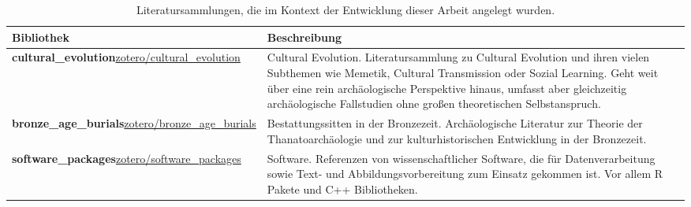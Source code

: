 \documentclass[openany,twoside,twocolumn]{book}
\begin{document}
\begin{table}

\caption{\label{tab:libraries}Literatursammlungen, die im Kontext der Entwicklung dieser Arbeit angelegt wurden.}
\centering
\begin{tabular}[t]{>{\raggedright\arraybackslash}p{20em}>{\raggedright\arraybackslash}p{25em}}
\toprule
Bibliothek & Beschreibung\\
\midrule
\textbf{cultural\_evolution}\newline \href{https://www.zotero.org/groups/2086516/cultural\_evolution}{zotero/cultural\_evolution} & Cultural Evolution. Literatursammlung zu Cultural Evolution und ihren vielen Subthemen wie Memetik, Cultural Transmission oder Sozial Learning. Geht weit über eine rein archäologische Perspektive hinaus, umfasst aber gleichzeitig archäologische Fallstudien ohne großen theoretischen Selbstanspruch.\\
\textbf{bronze\_age\_burials}\newline \href{https://www.zotero.org/groups/2199051/bronze\_age\_burials}{zotero/bronze\_age\_burials} & Bestattungssitten in der Bronzezeit. Archäologische Literatur zur Theorie der Thanatoarchäologie und zur kulturhistorischen Entwicklung in der Bronzezeit.\\
\textbf{software\_packages}\newline \href{https://www.zotero.org/groups/2211203/software\_packages}{zotero/software\_packages} & Software. Referenzen von wissenschaftlicher Software, die für Datenverarbeitung sowie Text- und Abbildungsvorbereitung zum Einsatz gekommen ist. Vor allem R Pakete und C++ Bibliotheken.\\
\bottomrule
\end{tabular}
\end{table}
\end{document}
